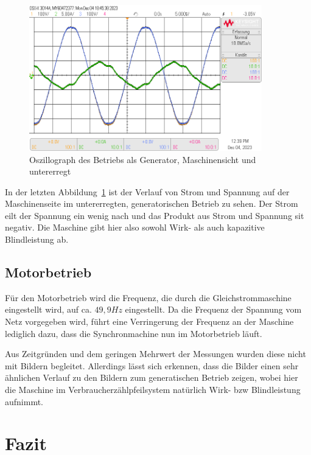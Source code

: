 \documentclass{report}
\begin{document}
\begin{figure}[!ht]
	\centering
	\includegraphics[width=0.9\textwidth]{./assets/img/synchronisation_maschine_generator_ue_vzp.png}
	\caption{Oszillograph des Betriebs als Generator, Maschinensicht und untererregt}
	\label{fig:smgu}
\end{figure}

In der letzten Abbildung~\ref{fig:smgu} ist der Verlauf von Strom und Spannung auf der Maschinenseite im untererregten, generatorischen Betrieb zu sehen. Der Strom eilt der Spannung ein wenig nach und das Produkt aus Strom und Spannung sit negativ. Die Maschine gibt hier also sowohl Wirk- als auch kapazitive Blindleistung ab.

\subsection{Motorbetrieb}
\label{sec:motorbetrieb}

Für den Motorbetrieb wird die Frequenz, die durch die Gleichstrommaschine eingestellt wird, auf ca. $49,9Hz$ eingestellt. Da die Frequenz der Spannung vom Netz vorgegeben wird, führt eine Verringerung der Frequenz an der Maschine lediglich dazu, dass die Synchronmachine nun im Motorbetrieb läuft.

Aus Zeitgründen und dem geringen Mehrwert der Messungen wurden diese nicht mit Bildern begleitet. Allerdings lässt sich erkennen, dass die Bilder einen sehr ähnlichen Verlauf zu den Bildern zum generatischen Betrieb zeigen, wobei hier die Maschine im Verbraucherzählpfeilsystem natürlich Wirk- bzw Blindleistung aufnimmt.

\section{Fazit}
\label{sec:fazit}
\end{document}
